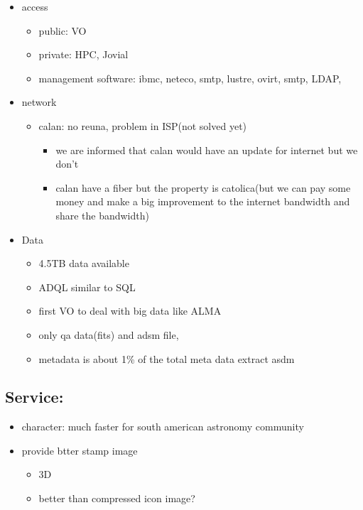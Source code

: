 \documentclass[11pt]{article}
\begin{document}
\begin{itemize}
\begin{itemize}
\end{itemize}
\item access
\begin{itemize}
\item public: VO
\item private: HPC, Jovial
\item management software: ibmc, neteco, smtp, lustre, ovirt, smtp, LDAP,
\end{itemize}
\item network
\begin{itemize}
\item calan: no reuna, problem in ISP(not solved yet)
\begin{itemize}
\item we are informed that calan would have an update for internet but we don't
\item calan have a fiber but the property is catolica(but we can pay some money and make a big improvement to the internet bandwidth and share the bandwidth)
\end{itemize}
\end{itemize}
\item Data
\begin{itemize}
\item 4.5TB data available
\item ADQL similar to SQL
\item first VO to deal with big data like ALMA
\item only qa data(fits) and adsm file,
\item metadata is about 1\% of the total meta data extract asdm
\end{itemize}
\end{itemize}

\subsection{Service:}
\label{sec-1-2}
\begin{itemize}
\item character: much faster for south american astronomy community
\item provide btter stamp image
\begin{itemize}
\item 3D
\item better than compressed icon image?
\end{itemize}
\end{itemize}
\end{document}
